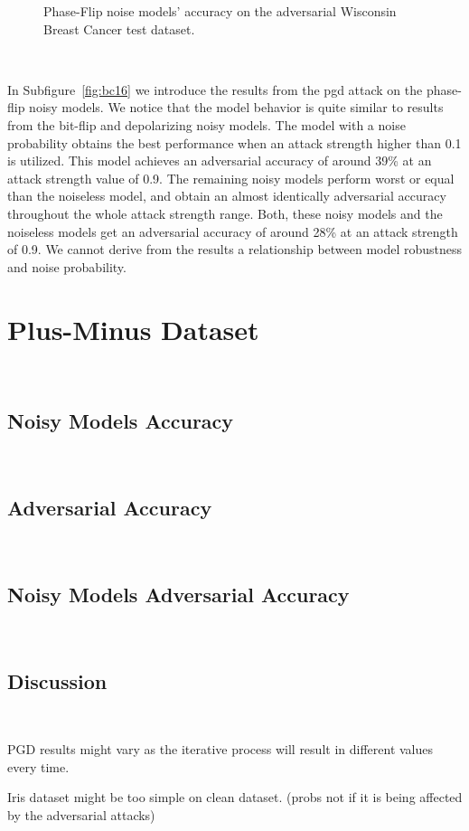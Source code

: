 \begin{figure}[!h]
  \caption{Phase-Flip noise models' accuracy on the adversarial Wisconsin Breast Cancer test dataset.}
  \label{fig:bc-1516}
\end{figure} \

In Subfigure~\ref{fig:bc16} we introduce the results from the \ac{pgd}
attack on the phase-flip noisy models. We notice that the model behavior
is quite similar to results from the bit-flip and depolarizing noisy
models. The model with a noise probability obtains the best performance
when an attack strength higher than 0.1 is utilized. This model achieves
an adversarial accuracy of around 39\% at an attack strength value of
0.9. The remaining noisy models perform worst or equal than the
noiseless model, and obtain an almost identically adversarial
accuracy throughout the whole attack strength range. Both, these noisy
models and the noiseless models get an adversarial accuracy of around
28\% at an attack strength of 0.9. We cannot derive from the results
a relationship between model robustness and noise probability. \

\section{Plus-Minus Dataset}\label{section:plus-minus-eval} \

\subsection{Noisy Models Accuracy}\label{subsection:plus-minus-noisy-acc} \

\subsection{Adversarial Accuracy}\label{subsection:plus-minus-adv-acc} \

\subsection{Noisy Models Adversarial Accuracy}\label{subsection:plus-minus-noisy-adv-acc} \

\subsection{Discussion}\label{subsection:discussion} \

PGD results might vary as the iterative process will result in different
values every time. \

Iris dataset might be too simple on clean dataset. (probs not if it is being affected by the adversarial attacks)

